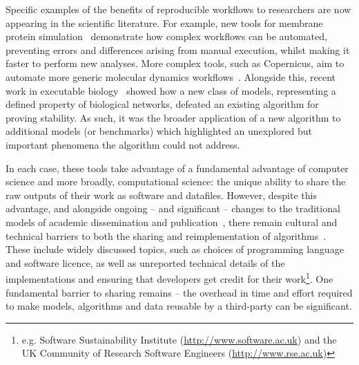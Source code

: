 \documentclass[conference]{IEEEtran}
\begin{document}
Specific examples of the benefits of reproducible workflows to
researchers are now appearing in the scientific literature. For
example, new tools for membrane protein
simulation~\cite{Stansfeld,Hall2014} demonstrate how complex workflows
can be automated, preventing errors and differences arising from
manual execution, whilst making it faster to perform new
analyses. More complex tools, such as Copernicus, aim to automate more
generic molecular dynamics workflows~\cite{Pronk}. Alongside this,
recent work in executable biology~\cite{Cook} showed how a new class
of models, representing a defined property of biological networks,
defeated an existing algorithm for proving stability. As such, it was
the broader application of a new algorithm to additional models (or
benchmarks) which highlighted an unexplored but important phenomena
the algorithm could not address.

In each case, these tools take advantage of a fundamental advantage of
computer science and more broadly, computational science: the unique
ability to share the raw outputs of their work as software and
datafiles. However, despite this advantage, and alongside ongoing --
and significant -- changes to the traditional models of academic
dissemination and
publication~\cite{deroure:2010,stodden-et-al:2013,fursin+dubach:2014},
there remain cultural and technical barriers to both the sharing and
reimplementation of algorithms~\cite{crick-et-al_wssspe2}. These
include widely discussed topics, such as choices of programming
language and software licence, as well as unreported technical details
of the implementations and ensuring that developers get credit for
their work\footnote{e.g. Software Sustainability Institute
(\url{http://www.software.ac.uk}) and the UK Community of Research
Software Engineers (\url{http://www.rse.ac.uk})}. One fundamental
barrier to sharing remains -- the overhead in time and effort required
to make models, algorithms and data reusable by a third-party can be significant.


\end{document}
